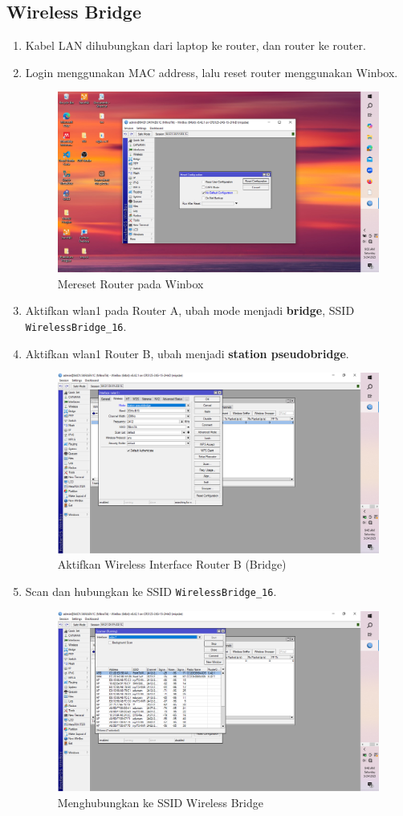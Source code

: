 \subsection{Wireless Bridge}
\begin{enumerate}
    \item Kabel LAN dihubungkan dari laptop ke router, dan router ke router.
    \item Login menggunakan MAC address, lalu reset router menggunakan Winbox.
    \begin{figure}[H]
        \centering
        \includegraphics[width=0.5\linewidth]{gambar1.png}
        \caption{Mereset Router pada Winbox}
        \label{fig:reset-bridge}
    \end{figure}

    \item Aktifkan wlan1 pada Router A, ubah mode menjadi \textbf{bridge}, SSID \texttt{WirelessBridge\_16}.


    \item Aktifkan wlan1 Router B, ubah menjadi \textbf{station pseudobridge}.
    \begin{figure}[H]
        \centering
        \includegraphics[width=0.5\linewidth]{gambar3w.png}
        \caption{Aktifkan Wireless Interface Router B (Bridge)}
        \label{fig:wlan-b-bridge}
    \end{figure}

    \item Scan dan hubungkan ke SSID \texttt{WirelessBridge\_16}.
    \begin{figure}[H]
        \centering
        \includegraphics[width=0.5\linewidth]{gambar3m.png}
        \caption{Menghubungkan ke SSID Wireless Bridge}
        \label{fig:ssid-bridge}
    \end{figure}


\end{enumerate}
